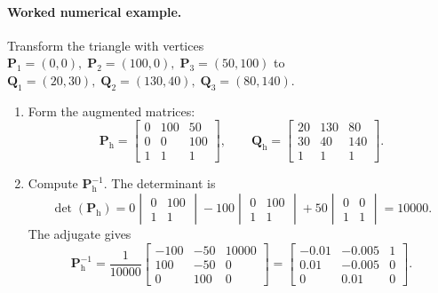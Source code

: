 \paragraph{Worked numerical example.}
Transform the triangle with vertices $\mathbf{P}_1=(0,0),\; \mathbf{P}_2=(100,0),\; \mathbf{P}_3=(50,100)$ to $\mathbf{Q}_1=(20,30),\; \mathbf{Q}_2=(130,40),\; \mathbf{Q}_3=(80,140)$.

\begin{enumerate}
    \item Form the augmented matrices:
    \[
        \mathbf{P}_{\mathrm{h}} =
        \begin{bmatrix}
            0   & 100 & 50  \\
            0   & 0   & 100 \\
            1   & 1   & 1
        \end{bmatrix},
        \qquad
        \mathbf{Q}_{\mathrm{h}} =
        \begin{bmatrix}
            20  & 130 & 80  \\
            30  & 40  & 140 \\
            1   & 1   & 1
        \end{bmatrix}.
    \]

    \item Compute $\mathbf{P}_{\mathrm{h}}^{-1}$.  The determinant is
    \[
        \det(\mathbf{P}_{\mathrm{h}})
        = 0\!\begin{vmatrix}0 & 100 \\ 1 & 1\end{vmatrix}
        - 100\!\begin{vmatrix}0 & 100 \\ 1 & 1\end{vmatrix}
        + 50\!\begin{vmatrix}0 & 0 \\ 1 & 1\end{vmatrix}
        = 10000.
    \]
    The adjugate gives
    \[
        \mathbf{P}_{\mathrm{h}}^{-1} = \frac{1}{10000}
        \begin{bmatrix}
            -100  &  -50 & 10000 \\
             100  &  -50 & 0     \\
             0    &  100 & 0
        \end{bmatrix}
        =
        \begin{bmatrix}
            -0.01  &  -0.005 &  1 \\
             0.01  &  -0.005 &  0 \\
             0     &   0.01  &  0
        \end{bmatrix}.
    \]


\end{enumerate}
